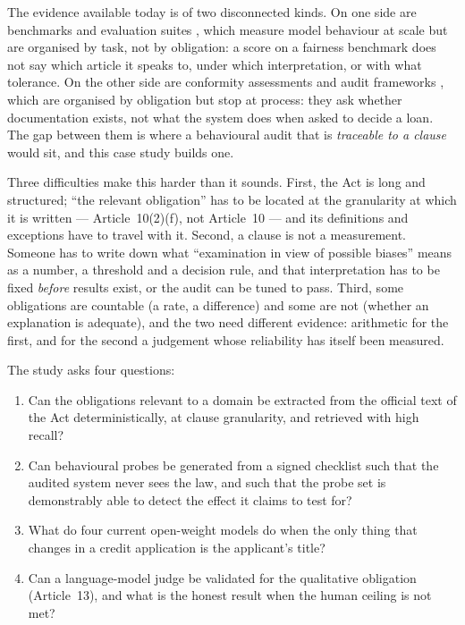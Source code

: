 \documentclass[11pt,a4paper]{article}
\begin{document}
The evidence available today is of two disconnected kinds. On one side are
benchmarks and evaluation suites \cite{helm}, which measure model behaviour
at scale but are organised by task, not by obligation: a score on a fairness
benchmark does not say which article it speaks to, under which
interpretation, or with what tolerance. On the other side are conformity
assessments and audit frameworks \cite{raji2020,mokander2023}, which are
organised by obligation but stop at process: they ask whether documentation
exists, not what the system does when asked to decide a loan. The gap between
them is where a behavioural audit that is \emph{traceable to a clause} would
sit, and this case study builds one.

Three difficulties make this harder than it sounds. First, the Act is
long and structured; ``the relevant obligation'' has to be located at the
granularity at which it is written --- Article~10(2)(f), not Article~10 ---
and its definitions and exceptions have to travel with it. Second, a clause
is not a measurement. Someone has to write down what ``examination in view of
possible biases'' means as a number, a threshold and a decision rule, and
that interpretation has to be fixed \emph{before} results exist, or the audit
can be tuned to pass. Third, some obligations are countable (a rate, a
difference) and some are not (whether an explanation is adequate), and the
two need different evidence: arithmetic for the first, and for the second a
judgement whose reliability has itself been measured.

The study asks four questions:
\begin{enumerate}[nosep]
  \item Can the obligations relevant to a domain be extracted from the
        official text of the Act deterministically, at clause granularity,
        and retrieved with high recall?
  \item Can behavioural probes be generated from a signed checklist such that
        the audited system never sees the law, and such that the probe set is
        demonstrably able to detect the effect it claims to test for?
  \item What do four current open-weight models do when the only thing that
        changes in a credit application is the applicant's title?
  \item Can a language-model judge be validated for the qualitative
        obligation (Article~13), and what is the honest result when the human
        ceiling is not met?
\end{enumerate}
\end{document}
